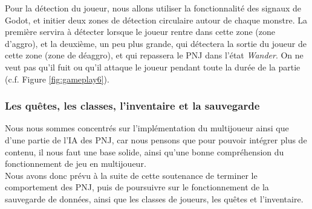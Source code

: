 Pour la détection du joueur, nous allons utiliser la fonctionnalité des signaux de Godot, et initier deux zones de détection circulaire autour de chaque monstre.
La première servira à détecter lorsque le joueur rentre dans cette zone (zone d'aggro), et la deuxième, un peu plus grande, qui détectera la sortie du joueur de cette zone (zone de déaggro), et qui repassera le PNJ dans l'état \textit{Wander}.
On ne veut pas qu'il fuit ou qu'il attaque le joueur pendant toute la durée de la partie (c.f. Figure \ref*{fig:gameplay6}).


\subsubsection*{Les quêtes, les classes, l'inventaire et la sauvegarde}

Nous nous sommes concentrés sur l'implémentation du multijoueur ainsi que d'une partie de l'IA des PNJ, car nous pensons que pour pouvoir intégrer plus de contenu, il nous faut une base solide, ainsi qu'une bonne compréhension du fonctionnement de jeu en multijoueur.
\\

Nous avons donc prévu à la suite de cette soutenance de terminer le comportement des PNJ, puis de poursuivre sur le fonctionnement de la sauvegarde de données, ainsi que les classes de joueurs, les quêtes et l'inventaire.
